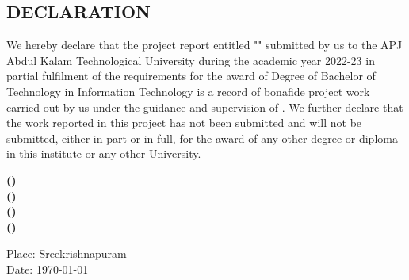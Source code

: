 \begin{titlepage}
\chapter*{DECLARATION}
\thispagestyle{empty}

\noindent We hereby declare that the project report entitled "{\textbf{\cTitle}}" submitted by us to the APJ Abdul Kalam Technological University during the academic year 2022-23 in partial fulfilment of the requirements for the award of Degree of Bachelor of Technology in Information Technology is a record of bonafide project work carried out by us under the guidance and supervision of \cGuide. We further declare that the work reported in this project has not been submitted and will not be submitted, either in part or in full, for the award of any other degree or diploma in this institute or any other University.

\vspace{2cm}

\begin{flushright}
\textbf{\MakeUppercase{\cMembOne} (\cMembOneRegNo)} \\
\textbf{\MakeUppercase{\cMembTwo} (\cMembTwoRegNo)} \\ 
\textbf{\MakeUppercase{\cMembThree} (\cMembThreeRegNo)} \\
\textbf{\MakeUppercase{\cMembFour} (\cMembFourRegNo)}
\end{flushright}

\noindent Place: Sreekrishnapuram \\
Date: \today

\end{titlepage}